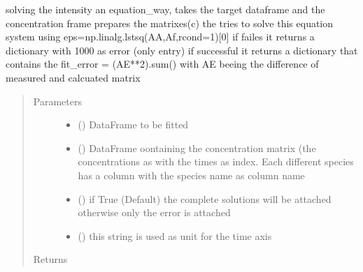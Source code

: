 \documentclass[letterpaper,10pt,english]{sphinxmanual}
\begin{document}
\begin{fulllineitems}
\label{\detokenize{plot_func:plot_func.fill_int}}
solving the intensity an equation\_way, takes the target dataframe and the concentration frame
prepares the matrixes(c) the tries to solve this equation system using
eps=np.linalg.lstsq(AA,Af,rcond=\sphinxhyphen{}1){[}0{]}
if failes it returns a dictionary with 1000 as error (only entry) if successful
it returns a dictionary that contains the
fit\_error = (AE**2).sum() with AE beeing the difference of measured and calcuated matrix
\begin{quote}\begin{description}
\item[{Parameters}] \leavevmode\begin{itemize}
\item {} 
 () \textendash{} DataFrame to be fitted

\item {} 
 () \textendash{} DataFrame oontaining the concentration matrix (the concentrations as with the times as index.
Each different species has a column with the species name as column name

\item {} 
 (\sphinxstyleliteralemphasis{\sphinxupquote{,}}) \textendash{} if True (Default) the complete solutions will be attached otherwise only the error is attached

\item {} 
 (\sphinxstyleliteralemphasis{\sphinxupquote{,}}) \textendash{} this string is used as unit for the time axis

\end{itemize}

\item[{Returns}] \leavevmode


\end{description}
\end{quote}
\end{fulllineitems}
\end{document}

